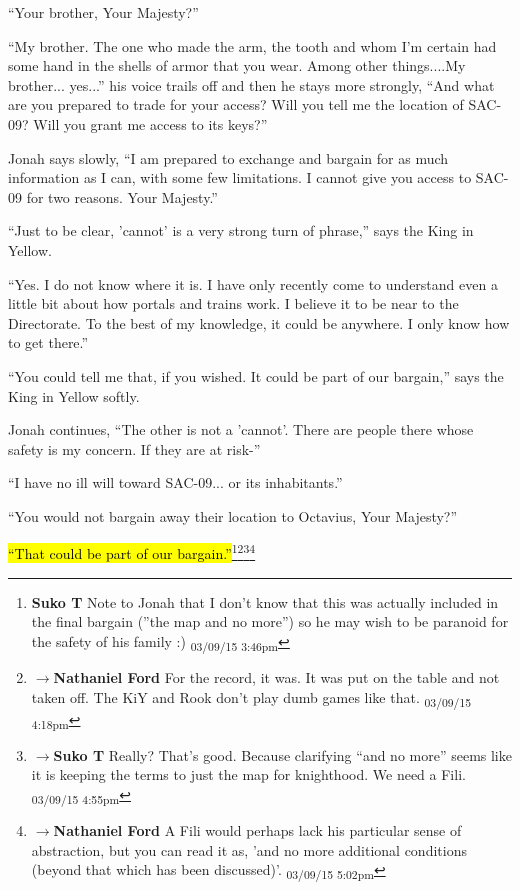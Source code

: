 ``Your brother, Your Majesty?''

``My brother.  The one who made the arm, the tooth and whom I'm certain had some hand in the shells of armor that you wear.  Among other things....My brother... yes...'' his voice trails off and then he stays more strongly, ``And what are you prepared to trade for your access?  Will you tell me the location of SAC-09?  Will you grant me access to its keys?''

Jonah says slowly, ``I am prepared to exchange and bargain for as much information as I can, with some few limitations.  I cannot give you access to SAC-09 for two reasons. Your Majesty.''

``Just to be clear, 'cannot' is a very strong turn of phrase,'' says the King in Yellow.

``Yes.  I do not know where it is.  I have only recently come to understand even a little bit about how portals and trains work.  I believe it to be near to the Directorate.  To the best of my knowledge, it could be anywhere.  I only know how to get there.''

``You could tell me that, if you wished.  It could be part of our bargain,'' says the King in Yellow softly.

Jonah continues, ``The other is not a 'cannot'.  There are people there whose safety is my concern.  If they are at risk-''

``I have no ill will toward SAC-09... or its inhabitants.''

``You would not bargain away their location to Octavius, Your Majesty?''

\hl{``That could be part of our bargain.''}\footnote{\textbf{Suko T }Note to Jonah that I don't know that this was actually included in the final bargain (''the map and no more'') so he may wish to be paranoid for the safety of his family :) \textsubscript{03/09/15 3:46pm}}\footnote{$\rightarrow$\textbf{Nathaniel Ford }For the record, it was. It was put on the table and not taken off. The KiY and Rook don't play dumb games like that. \textsubscript{03/09/15 4:18pm}}\footnote{$\rightarrow$\textbf{Suko T }Really?  That's good.  Because clarifying ``and no more'' seems like it is keeping the terms to just the map for knighthood.   We need a Fili. \textsubscript{03/09/15 4:55pm}}\footnote{$\rightarrow$\textbf{Nathaniel Ford }A Fili would perhaps lack his particular sense of abstraction, but you can read it as, 'and no more additional conditions (beyond that which has been discussed)'. \textsubscript{03/09/15 5:02pm}}

